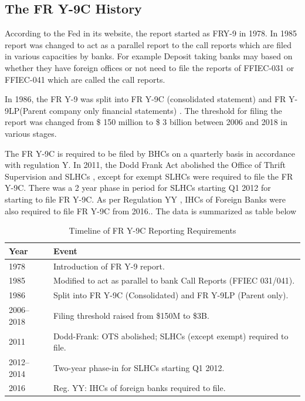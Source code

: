 \documentclass[conference]{IEEEtran}
\begin{document}
\subsection{The FR Y-9C History}
    According to the Fed in its website, the report started as FRY-9 in 1978. In 1985 report was changed to act as a parallel report to the call reports which are filed in various capacities by banks. For example Deposit taking banks may based on whether they have foreign offices or not need to file the reports of FFIEC-031 or FFIEC-041 which are called the call reports. 
    
    In 1986, the FR Y-9 was split into FR Y-9C (consolidated statement) and FR Y-9LP(Parent company only financial statements) . The threshold for filing the report was changed from \$ 150 million to \$ 3 billion between 2006 and 2018 in various stages. 
    
    The FR Y-9C is required to be filed by BHCs on a quarterly basis in accordance with regulation Y. In 2011, the Dodd Frank Act abolished the Office of Thrift Supervision and SLHCs , except for exempt SLHCs were required to file the FR Y-9C. There was a 2 year phase in period for SLHCs starting Q1 2012 for starting to file FR Y-9C. As per Regulation YY , IHCs of Foreign Banks were also required to file FR Y-9C from 2016.\cite{Fed9C}. The data is summarized as table below
    
    \begin{table}[htbp]
    	\centering
    	\caption{Timeline of FR Y-9C Reporting Requirements\cite{Fed9C}}
    	\begin{tabular}{|p{1.5cm}|p{6cm}|}
    		\hline
    		\textbf{Year} & \textbf{Event} \\
    		\hline
    		1978 & Introduction of FR Y-9 report. \\
    		\hline
    		1985 & Modified to act as parallel to bank Call Reports (FFIEC 031/041). \\
    		\hline
    		1986 & Split into FR Y-9C (Consolidated) and FR Y-9LP (Parent only). \\
    		\hline
    		2006--2018 & Filing threshold raised from \$150M to \$3B. \\
    		\hline
    		2011 & Dodd-Frank: OTS abolished; SLHCs (except exempt) required to file. \\
    		\hline
    		2012--2014 & Two-year phase-in for SLHCs starting Q1 2012. \\
    		\hline
    		2016 & Reg. YY: IHCs of foreign banks required to file. \\
    		\hline
    	\end{tabular}
    \end{table}
\end{document}
